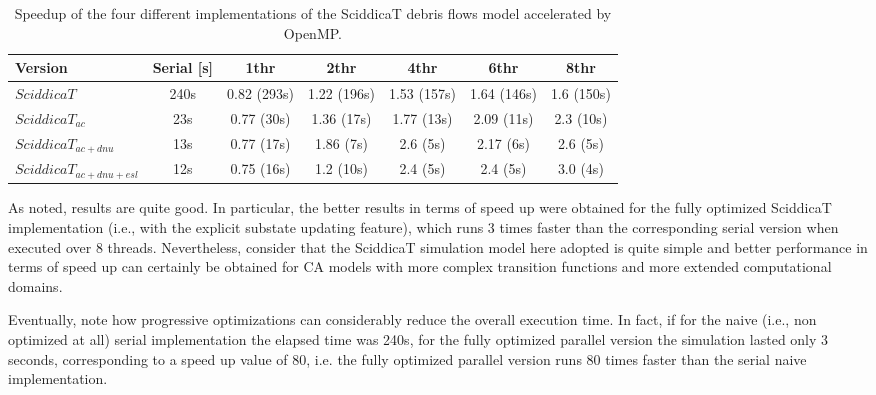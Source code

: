 \begin{table}
  \centering
  \footnotesize
  \begin{tabular}{l|c|c|c|c|c|c}
    \hline
    Version & Serial [s] & 1thr & 2thr & 4thr & 6thr & 8thr\\
    \hline
    \hline
    $SciddicaT$            & 240s & 0.82 (293s) & 1.22 (196s) & 1.53 (157s) & 1.64 (146s) & 1.6 (150s)\\
    $SciddicaT_{ac}$       & 23s  & 0.77 (30s)  & 1.36 (17s)  & 1.77 (13s)  & 2.09 (11s)  & 2.3 (10s)\\
    $SciddicaT_{ac+dnu}$    & 13s  & 0.77 (17s)  & 1.86 (7s)   & 2.6  (5s)   & 2.17  (6s)  & 2.6 (5s)\\
    $SciddicaT_{ac+dnu+esl}$ & 12s  & 0.75 (16s)  & 1.2  (10s)  & 2.4  (5s)   & 2.4  (5s)   & 3.0 (4s)\\
    \hline
  \end{tabular}
  \caption{Speedup of the four different
    implementations of the SciddicaT debris flows model accelerated by OpenMP.}
  \label{tab:speedup}
\end{table}

As noted, results are quite good. In particular, the better
results in terms of speed up were obtained for the fully optimized
SciddicaT implementation (i.e., with the explicit substate updating
feature), which runs 3 times faster than the corresponding serial
version when executed over 8 threads. Nevertheless, consider that the
SciddicaT simulation model here adopted is quite simple and better
performance in terms of speed up can certainly be obtained for CA
models with more complex transition functions and more extended
computational domains.

Eventually, note how progressive optimizations can considerably
reduce the overall execution time. In fact, if for the naive (i.e., non
optimized at all) serial implementation the elapsed time was 240s, for
the fully optimized parallel version the simulation lasted only 3
seconds, corresponding to a speed up value of 80, i.e. the fully
optimized parallel version runs 80 times faster than the serial naive
implementation.

